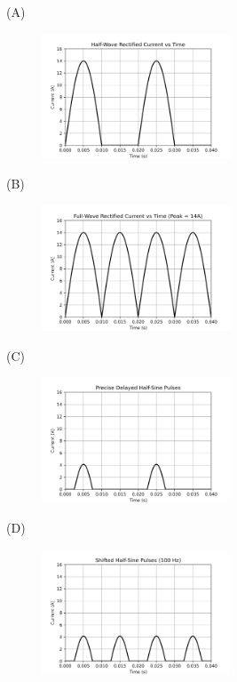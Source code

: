 \documentclass[12pt]{article}
\begin{document}
\begin{enumerate}[label=Q\arabic*.]
\begin{multicols}{2}
(A) \begin{figure}[H]
  \centering
  \includegraphics[width=0.5\textwidth]{figs/half_wave_rectified.png}
  \caption{}
\end{figure}

(B) \begin{figure}[H]
  \centering
  \includegraphics[width=0.5\textwidth]{figs/full_wave_peak_14A.png}
  \caption{}
\end{figure}

(C) \begin{figure}[H]
  \centering
  \includegraphics[width=0.5\textwidth]{figs/precise_half_sine_pulses.png}
  \caption{}
\end{figure}

(D) \begin{figure}[H]
  \centering
  \includegraphics[width=0.5\textwidth]{figs/shifted_half_sine_pulses.png}
  \caption{}
\end{figure}
\end{multicols}


\end{enumerate}
\end{document}
